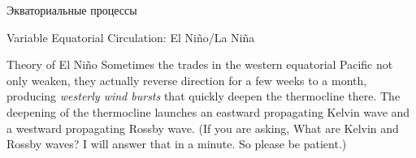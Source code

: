 \begin{chapter}{Экваториальные процессы}
\begin{section}{Variable Equatorial Circulation: El Ni\~{n}o/La Ni\~{n}a}
\begin{paragraph}{Theory of El Ni\~{n}o}
Sometimes the trades in the western equatorial Pacific not only
weaken, they actually reverse direction for a few weeks to a month,
producing \textit{westerly wind bursts} that quickly deepen the
thermocline there. The deepening of the
thermocline launches an eastward
propagating Kelvin wave and a westward propagating
Rossby wave. (If you are asking, What are Kelvin
and Rossby waves? I will answer that in a minute. So please be
patient.)
%



\end{paragraph}
\end{section}
\end{chapter}
